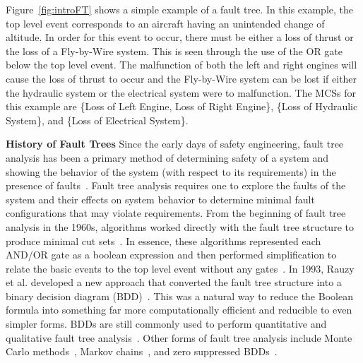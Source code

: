 Figure~\ref{fig:introFT} shows a simple example of a fault tree. In this example, the top level event corresponds to an aircraft having an unintended change of altitude. In order for this event to occur, there must be either a loss of thrust or the loss of a Fly-by-Wire system. This is seen through the use of the OR gate below the top level event. The malfunction of both the left and right engines will cause the loss of thrust to occur and the Fly-by-Wire system can be lost if either the hydraulic system or the electrical system were to malfunction. The MCSs for this example are \{Loss of Left Engine, Loss of Right Engine\}, \{Loss of Hydraulic System\}, and \{Loss of Electrical System\}. 


\textbf{History of Fault Trees} 
Since the early days of safety engineering, fault tree analysis has been a primary method of determining safety of a system and showing the behavior of the system (with respect to its requirements) in the presence of faults~\cite{0f356f05e72f43018211b36f97c8854a,vesely1981fault}. Fault tree analysis requires one to explore the faults of the system and their effects on system behavior to determine minimal fault configurations that may violate requirements. From the beginning of fault tree analysis in the 1960s, algorithms worked directly with the fault tree structure to produce minimal cut sets~\cite{10020219108,semanderes1971elraft}. In essence, these algorithms represented each AND/OR gate as a boolean expression and then performed simplification to relate the basic events to the top level event without any gates~\cite{0f356f05e72f43018211b36f97c8854a}. In 1993, Rauzy et al. developed a new approach that converted the fault tree structure into a binary decision diagram (BDD)~\cite{rauzy1993new}. This was a natural way to reduce the Boolean formula into something far more computationally efficient and reducible to even simpler forms. BDDs are still commonly used to perform quantitative and qualitative fault tree analysis~\cite{sinnamon1997new,bryant1986graph,aralia1996computation,reay2002fault,rauzy2007assessment,ge2015quantitative,jiang2018algebraic,banov2019new}.  Other forms of fault tree analysis include Monte Carlo methods~\cite{vesely1970prep}, Markov chains~\cite{boudali2007dynamic}, and zero suppressed BDDs~\cite{minato2001zero}. 




